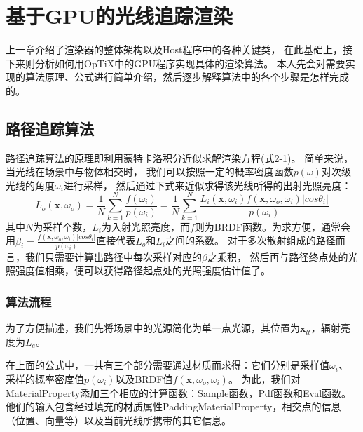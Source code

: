 \chapter{基于GPU的光线追踪渲染}
\label{cha:algorithms}

上一章介绍了渲染器的整体架构以及Host程序中的各种关键类，
在此基础上，接下来则分析如何用OpTiX中的GPU程序实现具体的渲染算法。
本人先会对需要实现的算法原理、公式进行简单介绍，然后逐步解释算法中的各个步骤是怎样完成的。

\section{路径追踪算法}
路径追踪算法的原理即利用蒙特卡洛积分近似求解渲染方程(式2-1)。
简单来说，当光线在场景中与物体相交时，
我们可以按照一定的概率密度函数$p(\omega)$对次级光线的角度$\omega_i$进行采样，
然后通过下式来近似求得该光线所得的出射光照亮度：
\begin{equation}
L_o(\textbf{x}, \omega_o) 
=\frac{1}{N}\sum_{k=1}^{N}\frac{f(\omega_i)}{p(\omega_i)} 
=\frac{1}{N}\sum_{k=1}^{N}\frac{L_i(\textbf{x}, \omega_i)f(\textbf{x}, \omega_o, \omega_i)|cos\theta_i|}{p(\omega_i)}
\end{equation}
其中$N$为采样个数，$L_i$为入射光照亮度，而$f$则为BRDF函数。为求方便，通常会用$\beta_i=\frac{f(\textbf{x}, \omega_o, \omega_i)|cos\theta_i|}{p(\omega_i)}$直接代表$L_o$和$L_i$之间的系数。
对于多次散射组成的路径而言，我们只需要计算出路径中每次采样对应的$\beta$之乘积，
然后再与路径终点处的光照强度值相乘，便可以获得路径起点处的光照强度估计值了。

\subsection{算法流程}

为了方便描述，我们先将场景中的光源简化为单一点光源，其位置为$\textbf{x}_{lt}$，辐射亮度为$L_e$。

在上面的公式中，一共有三个部分需要通过材质而求得：它们分别是采样值$\omega_i$、
采样的概率密度值$p(\omega_i)$以及BRDF值$f(\textbf{x}, \omega_o, \omega_i)$。
为此，我们对MaterialProperty添加三个相应的计算函数：Sample函数，Pdf函数和Eval函数。
他们的输入包含经过填充的材质属性PaddingMaterialProperty，相交点的信息（位置、向量等）以及当前光线所携带的其它信息。

